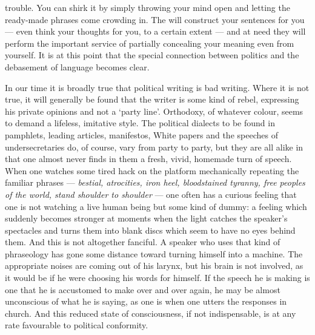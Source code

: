 \documentclass[12pt]{article}
\begin{document}
trouble. You can shirk it by simply throwing your mind open and letting the ready-made phrases come crowding in. The will construct your sentences for you — even think your thoughts for you, to a certain extent — and at need they will perform the important service of partially concealing your meaning even from yourself. It is at this point that the special connection between politics and the debasement of language becomes clear.

In our time it is broadly true that political writing is bad writing. Where it is not true, it will generally be found that the writer is some kind of rebel, expressing his private opinions and not a `party line’. Orthodoxy, of whatever colour, seems to demand a lifeless, imitative style. The political dialects to be found in pamphlets, leading articles, manifestos, White papers and the speeches of undersecretaries do, of course, vary from party to party, but they are all alike in that one almost never finds in them a fresh, vivid, homemade turn of speech. When one watches some tired hack on the platform mechanically repeating the familiar phrases — \textit{bestial, atrocities, iron heel, bloodstained tyranny, free peoples of the world, stand shoulder to shoulder} — one often has a curious feeling that one is not watching a live human being but some kind of dummy: a feeling which suddenly becomes stronger at moments when the light catches the speaker's spectacles and turns them into blank discs which seem to have no eyes behind them. And this is not altogether fanciful. A speaker who uses that kind of phraseology has gone some distance toward turning himself into a machine. The appropriate noises are coming out of his larynx, but his brain is not involved, as it would be if he were choosing his words for himself. If the speech he is making is one that he is accustomed to make over and over again, he may be almost unconscious of what he is saying, as one is when one utters the responses in church. And this reduced state of consciousness, if not indispensable, is at any rate favourable to political conformity.
\end{document}
